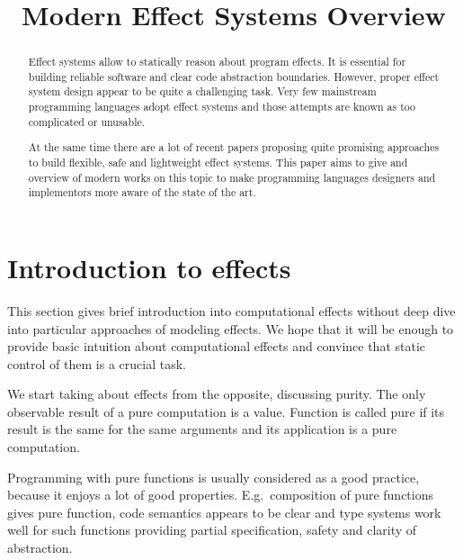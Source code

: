 \documentclass[conference]{IEEEtran}
\begin{document}
    \title{Modern Effect Systems Overview
    }

    \author{
    }

    \maketitle


    \begin{abstract}
        Effect systems allow to statically reason about program effects.
        It is essential for building reliable software and clear code abstraction boundaries.
        However, proper effect system design appear to be quite a challenging task.
        Very few mainstream programming languages adopt effect systems and those attempts are known as too complicated or unusable.

        At the same time there are a lot of recent papers proposing quite promising approaches to build flexible, safe and lightweight effect systems.
        This paper aims to give and overview of modern works on this topic to make programming languages designers and implementors more aware of the state of the art.
    \end{abstract}


    \section{Introduction to effects}

    This section gives brief introduction into computational effects without deep dive into particular approaches of modeling effects.
    We hope that it will be enough to provide basic intuition about computational effects and convince that static control of them is a crucial task.

    We start taking about effects from the opposite, discussing purity.
    The only observable result of a pure computation is a value.
    Function is called pure if its result is the same for the same arguments and its application is a pure computation.

    Programming with pure functions is usually considered as a good practice, because it enjoys a lot of good properties.
    E.g.\ composition of pure functions gives pure function, code semantics appears to be clear and type systems work well for such functions providing partial specification, safety and clarity of abstraction.
\end{document}
